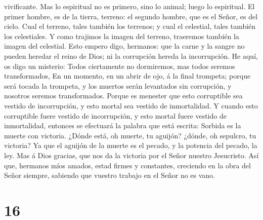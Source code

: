 vivificante.  Mas lo espiritual no es primero, sino lo
animal; luego lo espiritual.  El primer hombre, es de la
tierra, terreno: el segundo hombre, que es el Señor, es del cielo.
 Cual el terreno, tales también los terrenos; y cual el
celestial, tales también los celestiales.  Y como
trajimos la imagen del terreno, traeremos también la imagen del
celestial.  Esto empero digo, hermanos: que la carne y la
sangre no pueden heredar el reino de Dios; ni la corrupción hereda la
incorrupción.  He aquí, os digo un misterio: Todos
ciertamente no dormiremos, mas todos seremos transformados,
 En un momento, en un abrir de ojo, á la final trompeta;
porque será tocada la trompeta, y los muertos serán levantados sin
corrupción, y nosotros seremos transformados.  Porque es
menester que esto corruptible sea vestido de incorrupción, y esto mortal
sea vestido de inmortalidad.  Y cuando esto corruptible
fuere vestido de incorrupción, y esto mortal fuere vestido de
inmortalidad, entonces se efectuará la palabra que está escrita: Sorbida
es la muerte con victoria.  ¿Dónde está, oh muerte, tu
aguijón? ¿dónde, oh sepulcro, tu victoria?  Ya que el
aguijón de la muerte es el pecado, y la potencia del pecado, la ley.
 Mas á Dios gracias, que nos da la victoria por el Señor
nuestro Jesucristo.  Así que, hermanos míos amados, estad
firmes y constantes, creciendo en la obra del Señor siempre, sabiendo
que vuestro trabajo en el Señor no es vano.

\hypertarget{section-15}{%
\section{16}\label{section-15}}

